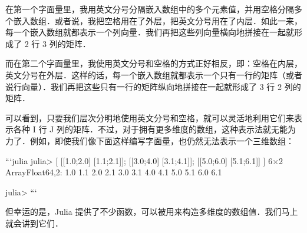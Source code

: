 在第一个字面量里，我用英文分号分隔嵌入数组中的多个元素值，并用空格分隔多个嵌入数组．或者说，我把空格用在了外层，把英文分号用在了内层．如此一来，每一个嵌入数组就都表示一个列向量．我们再把这些列向量横向地拼接在一起就形成了 2 行 3 列的矩阵．

而在第二个字面量里，我使用英文分号和空格的方式正好相反，即：空格在内层，英文分号在外层．这样的话，每一个嵌入数组就都表示一个只有一行的矩阵（或者说行向量）．我们再把这些只有一行的矩阵纵向地拼接在一起就形成了 3 行 2 列的矩阵．

可以看到，只要我们层次分明地使用英文分号和空格，就可以灵活地利用它们来表示各种 I 行 J 列的矩阵．不过，对于拥有更多维度的数组，这种表示法就无能为力了．例如，即使我们像下面这样编写字面量，也仍然无法表示一个三维数组：

```julia
julia> [ [[1.0;2.0] [1.1;2.1]]; [[3.0;4.0] [3.1;4.1]]; [[5.0;6.0] [5.1;6.1]] ]
6×2 Array{Float64,2}:
 1.0  1.1
 2.0  2.1
 3.0  3.1
 4.0  4.1
 5.0  5.1
 6.0  6.1

julia> 
```

但幸运的是，Julia 提供了不少函数，可以被用来构造多维度的数组值．我们马上就会讲到它们．